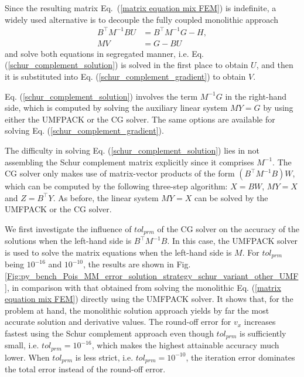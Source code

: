 \documentclass[review,3p]{elsarticle}
\begin{document}
Since the resulting matrix Eq.~(\ref{matrix equation mix FEM}) is indefinite, a widely used alternative is to decouple the fully coupled monolithic approach
\begin{subequations}
 \begin{align}
  B^{\top} M^{-1} B U &= B^{\top} M^{-1} G - H, 	\label{schur_complement_solution} \\
  MV&=G-BU						\label{schur_complement_gradient}
\end{align}						\label{schur_complement_solu_grad}%
\end{subequations}
and solve both equations in segregated manner, i.e. Eq. (\ref{schur_complement_solution}) is solved in the first place to obtain $U$, and then it is substituted into Eq. (\ref{schur_complement_gradient}) to obtain $V$.

Eq. (\ref{schur_complement_solution}) involves the term $M^{-1} G$ in the right-hand side, which is computed by solving the auxiliary linear system $MY=G$ by using either the UMFPACK or the CG solver. The same options are available for solving Eq. (\ref{schur_complement_gradient}). 

The difficulty in solving Eq. (\ref{schur_complement_solution}) lies in not assembling the Schur complement matrix explicitly since it comprises $M^{-1}$. 
The CG solver only makes use of matrix-vector products of the form $(B^{\top}M^{-1}B)W$, which can be computed by the following three-step algorithm: $X=BW$, $MY=X$ and $Z=B^{\top}Y$. As before, the linear system $MY=X$ can be solved by the UMFPACK or the CG solver.

We first investigate the influence of $tol_{prm}$ of the CG solver on the accuracy of the solutions when the left-hand side is $B^{\top}M^{-1}B$. In this case, the UMFPACK solver is used to solve the matrix equations when the left-hand side is $M$.  
For $tol_{prm}$ being $10^{-16}$ and $10^{-10}$, the results are shown in Fig. \ref{Fig:py_bench_Pois_MM_error_solution_strategy_schur_variant_other_UMF}, in comparison with that obtained from solving the monolithic Eq. (\ref{matrix equation mix FEM}) directly using the UMFPACK solver.
It shows that, for the problem at hand, the monolithic solution approach yields by far the most accurate solution and derivative values. The round-off error for $v_{x}$ increases fastest using the Schur complement approach even though $tol_{prm}$ is sufficiently small, i.e. $tol_{prm}=10^{-16}$, which makes the highest attainable accuracy much lower.
When $tol_{prm}$ is less strict, i.e. $tol_{prm}=10^{-10}$, the iteration error dominates the total error instead of the round-off error.
\end{document}
